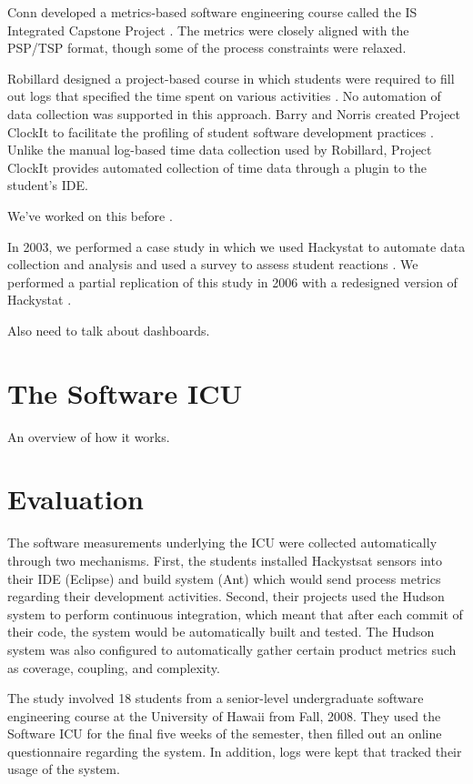 \documentclass{acm_proc_article-sp}
\begin{document}
Conn developed a metrics-based software engineering course called the 
IS Integrated Capstone Project \cite{Conn04}.  The metrics were closely aligned
with the PSP/TSP format, though some of the process constraints were relaxed. 

Robillard designed a project-based course in which students were required
to fill out logs that specified the time spent on various activities
\cite{Robillard98}.  No automation of data collection was supported in this
approach.  Barry and Norris created Project ClockIt to facilitate the
profiling of student software development practices \cite{Barry05}.  Unlike
the manual log-based time data collection used by Robillard, Project
ClockIt provides automated collection of time data through a plugin to the
student's IDE.

We've worked on this before \cite{csdl2-07-02,csdl2-03-12,csdl2-03-13}.

In 2003, we performed a case study in which 
we used Hackystat to automate data collection and analysis and used 
a survey to assess student reactions \cite{csdl2-03-12}.  We performed a 
partial replication of this study in 2006 with a redesigned version of
Hackystat \cite{csdl2-07-02}. 

Also need to talk about dashboards. 

\section{The Software ICU}
\label{sec:icu}

An overview of how it works.  

\section{Evaluation}
\label{sec:evaluation}

The software measurements underlying the ICU were collected automatically
through two mechanisms. First, the students installed Hackystsat sensors
into their IDE (Eclipse) and build system (Ant) which would send process
metrics regarding their development activities.  Second, their projects
used the Hudson system to perform continuous integration, which meant that
after each commit of their code, the system would be automatically built
and tested.  The Hudson system was also configured to automatically gather
certain product metrics such as coverage, coupling, and complexity.

The study involved 18 students from a senior-level undergraduate software
engineering course at the University of Hawaii from Fall, 2008.  They used
the Software ICU for the final five weeks of the semester, then filled out
an online questionnaire regarding the system.  In addition, logs were kept
that tracked their usage of the system.
\end{document}
